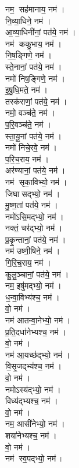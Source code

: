 \begin{multicols}{2}
\begin{flushleft}
नम॒ सह॑मानाय॒ नम॑।\\
नि॒व्या॒धिने॒ नम॑।\hfill {}\\
आ॒व्या॒धिनी॑नां॒ पत॑ये॒ नम॑।\\
नम॑ ककु॒भाय॒ नम॑।\\
नि॒ष॒ङ्गिणे॒ नम॑।\\
स्ते॒नानां॒ पत॑ये॒ नम॑।\\
नमो॑ निष॒ङ्गिणे॒ नम॑।\\
इ॒षु॒धि॒मते॒ नम॑।\\
तस्क॑राणां॒ पत॑ये॒ नम॑।\\
नमो॒ वञ्च॑ते॒ नम॑।\\
प॒रि॒वञ्च॑ते॒ नम॑।\\
स्ता॒यू॒नां पत॑ये॒ नम॑।\hfill {}\\
नमो॑ निचे॒रवे॒ नम॑।\\
प॒रि॒च॒राय॒ नम॑।\\
अर॑ण्यानां॒ पत॑ये॒ नम॑।\\
नम॑ सृका॒विभ्यो॒ नम॑।\\
जिघासद्भ्यो॒ नम॑।\\
मु॒ष्ण॒तां पत॑ये॒ नम॑।\\
नमो॑ऽसि॒मद्भ्यो॒ नम॑।\\
नक्तं॒ चर॑द्भ्यो॒ नम॑।\\
प्र॒कृ॒न्तानां॒ पत॑ये॒ नम॑।\\
नम॑ उष्णी॒षिने॒ नम॑।\hfill {}\\
गि॒रि॒च॒राय॒ नम॑।\\
कु॒लु॒ञ्चानां॒ पत॑ये॒  नम॑।\\
नम॒ इषु॑मद्भ्यो॒  नम॑।\\
ध॒न्वा॒विभ्य॑श्च॒  नम॑।\\
वो॒  नम॑।\\
नम॑ आतन्वा॒नेभ्यो॒ नम॑।\\
प्र॒ति॒दधा॑नेभ्यश्च॒  नम॑।\\
वो॒ नम॑।\\
नम॑ आ॒यच्छ॑द्भ्यो॒  नम॑।\\
 वि॒सृ॒जद्भ्य॑श्च॒  नम॑।\hfill {}\\
 वो॒ नम॑।\\
नमोऽस्य॑द्भ्यो॒  नम॑।\\
विध्य॑द्भ्यश्च॒  नम॑।\\
 वो॒ नम॑।\\
नम॒ आसी॑नेभ्यो॒  नम॑।\\
शया॑नेभ्यश्च॒  नम॑।\\
वो॒ नम॑।\\
नम॑ स्व॒पद्भ्यो॒  नम॑।\\

\end{flushleft}
\end{multicols}
